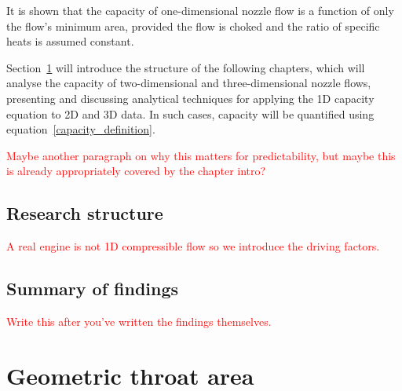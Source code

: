 \documentclass[a4paper, 11pt, twoside]{report}
\begin{document}
It is shown that the capacity of one-dimensional nozzle flow is a function of only the flow's minimum area, provided the flow is choked and the ratio of specific heats is assumed constant. 

Section~\ref{research_structure} will introduce the structure of the following chapters, which will analyse the capacity of two-dimensional and three-dimensional nozzle flows, presenting and discussing analytical techniques for applying the 1D capacity equation to 2D and 3D data. In such cases, capacity will be quantified using equation~\ref{capacity_definition}.

\textcolor{red}{Maybe another paragraph on why this matters for predictability, but maybe this is already appropriately covered by the chapter intro?}

\section{Research structure}
\label{research_structure}

\textcolor{red}{A real engine is not 1D compressible flow so we introduce the driving factors.}

\section{Summary of findings}

\textcolor{red}{Write this after you've written the findings themselves.}

\chapter{Geometric throat area}
\label{chapter_geometric_throat_area}


\end{document}
